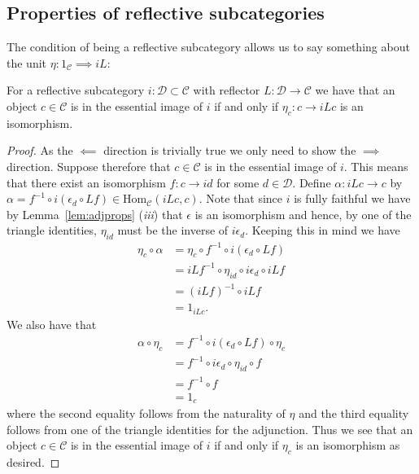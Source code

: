 \subsection{Properties of reflective subcategories} %
\label{sub:Properties of reflective subcategories}
The condition of being a reflective subcategory allows us to say something about the unit $ \eta: 1_\mathcal{C} \implies iL $:
\begin{lemma}
  \label{lem:ess}
  For a reflective subcategory $ i:\mathcal{D} \subset \mathcal{C} $ with reflector $ L: \mathcal{D} \to \mathcal{C} $ we have that an object $ c \in \mathcal{C} $ is in the essential image of $ i $ if and only if $ \eta_c: c \to iLc $ is an isomorphism.
\end{lemma}
\begin{proof}
  As the $ \impliedby $ direction is trivially true we only need to show the $ \implies $ direction. Suppose therefore that $ c \in \mathcal{C} $ is in the essential image of $ i $. This means that there exist an isomorphism $ f: c \to id $ for some $ d \in \mathcal{D} $. Define $ \alpha: iLc \to c $ by $ \alpha = f^{-1} \circ i(\epsilon_d \circ Lf) \in \text{Hom}_{\mathcal{C}}(iLc, c) $. Note that since $ i $ is fully faithful we have by Lemma~\ref{lem:adjprops} (\textit{iii}) that $ \epsilon $ is an isomorphism and hence, by one of the triangle identities, $ \eta_{id} $ must be the inverse of $ i\epsilon_d $. Keeping this in mind we have
  \begin{align*}
    \eta_c \circ \alpha &= \eta_c \circ f^{-1} \circ i(\epsilon_d \circ Lf) \\
                        &= iLf^{-1} \circ \eta_{id} \circ i\epsilon_{d} \circ iLf \\
                        &= (iLf)^{-1} \circ iLf \\
                        &= 1_{iLc}.
  \end{align*}
  We also have that
  \begin{align*}
    \alpha \circ \eta_c &= f^{-1} \circ i(\epsilon_d \circ Lf) \circ \eta_c \\
                        &= f^{-1} \circ i\epsilon_d \circ \eta_{id} \circ f \\
                        &= f^{-1} \circ f \\
                        &= 1_c
  \end{align*}
  where the second equality follows from the naturality of $ \eta $ and the third equality follows from one of the triangle identities for the adjunction. Thus we see that an object $ c \in \mathcal{C} $ is in the essential image of $ i $ if and only if $ \eta_c $ is an isomorphism as desired.
\end{proof}

